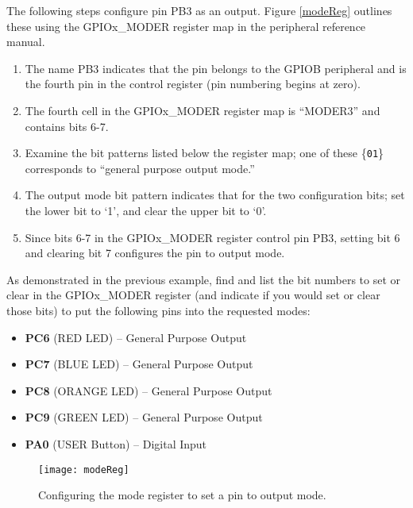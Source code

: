 \documentclass[11pt,fleqn]{book} %
\begin{document}
\begin{example}
    The following steps configure pin PB3 as an output. Figure \vref{modeReg} outlines these using the GPIOx\_MODER register map in the peripheral reference manual.
    \begin{enumerate}
        \item The name PB3 indicates that the pin belongs to the GPIOB peripheral and is the fourth pin in the control register (pin numbering begins at zero).
        \item The fourth cell in the GPIOx\_MODER register map is ``MODER3'' and contains bits 6-7.
        \item Examine the bit patterns listed below the register map; one of these \{\texttt{01}\} corresponds to ``general purpose output mode.''
        \item The output mode bit pattern indicates that for the two configuration bits; set the lower bit to `1', and clear the upper bit to `0'.
        \item Since bits 6-7 in the GPIOx\_MODER register control pin PB3, setting bit 6 and clearing bit 7 configures the pin to output mode. 
    \end{enumerate}  
\end{example}

\begin{exercise}
    
    As demonstrated in the previous example, find and list the bit numbers to set or clear in the GPIOx\_MODER register (and indicate if you would set or clear those bits) to put the following pins into the requested modes:
    
    \begin{itemize}
        \item \textbf{PC6} (RED LED) -- General Purpose Output 
        \item \textbf{PC7} (BLUE LED) -- General Purpose Output 
        \item \textbf{PC8} (ORANGE LED) -- General Purpose Output 
        \item \textbf{PC9} (GREEN LED) -- General Purpose Output 
        \item \textbf{PA0} (USER Button) -- Digital Input  
    \end{itemize}
\end{exercise}

\begin{figure}[]
    \centering\texttt{[image: modeReg]}
    \caption{Configuring the mode register to set a pin to output mode.}
    \label{modeReg}
\end{figure}
\end{document}
